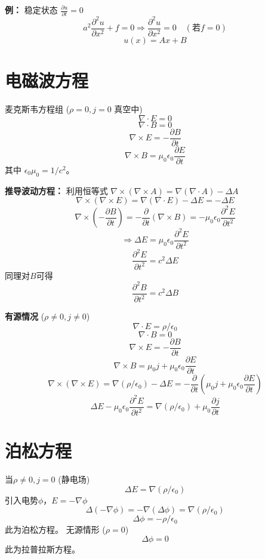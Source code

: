 \documentclass{article}
\begin{document}
	\textbf{例：} 稳定状态 $\frac{\partial u}{\partial t}=0$
	$$ 
	a^2 \frac{\partial^2 u}{\partial x^2} + f = 0 \Rightarrow \frac{\partial^2 u}{\partial x^2} = 0 \quad (\text{若} f=0) 
	$$
	$$ u(x) = Ax + B $$
	
	\section*{电磁波方程}
	麦克斯韦方程组 ($\rho=0, j=0$ 真空中)
	$$ \nabla \cdot E = 0 $$
	$$ \nabla \cdot B = 0 $$
	$$ \nabla \times E = -\frac{\partial B}{\partial t} $$
	$$ \nabla \times B = \mu_0 \epsilon_0 \frac{\partial E}{\partial t} $$
	其中 $\epsilon_0 \mu_0 = 1/c^2$。
	
	\textbf{推导波动方程：}
	利用恒等式 $\nabla \times (\nabla \times A) = \nabla(\nabla \cdot A) - \Delta A$
	$$ \nabla \times (\nabla \times E) = \nabla(\nabla \cdot E) - \Delta E = -\Delta E $$
	$$ \nabla \times (-\frac{\partial B}{\partial t}) = -\frac{\partial}{\partial t}(\nabla \times B) = -\mu_0 \epsilon_0 \frac{\partial^2 E}{\partial t^2} $$
	$$ \Rightarrow \Delta E = \mu_0 \epsilon_0 \frac{\partial^2 E}{\partial t^2} $$
	$$ \frac{\partial^2 E}{\partial t^2} = c^2 \Delta E $$
	同理对$B$可得
	$$ \frac{\partial^2 B}{\partial t^2} = c^2 \Delta B $$
	
	\textbf{有源情况} ($\rho \neq 0, j \neq 0$)
	$$ \nabla \cdot E = \rho/\epsilon_0 $$
	$$ \nabla \cdot B = 0 $$
	$$ \nabla \times E = -\frac{\partial B}{\partial t} $$
	$$ \nabla \times B = \mu_0 j + \mu_0 \epsilon_0 \frac{\partial E}{\partial t} $$
	$$ \nabla \times (\nabla \times E) = \nabla(\rho/\epsilon_0) - \Delta E = -\frac{\partial}{\partial t}(\mu_0 j + \mu_0 \epsilon_0 \frac{\partial E}{\partial t}) $$
	$$ \Delta E - \mu_0 \epsilon_0 \frac{\partial^2 E}{\partial t^2} = \nabla(\rho/\epsilon_0) + \mu_0 \frac{\partial j}{\partial t} $$
	
	\section*{泊松方程}
	当$\rho \neq 0, j=0$ (静电场)
	$$ \Delta E = \nabla(\rho/\epsilon_0) $$
	引入电势$\phi$，$E = -\nabla\phi$
	$$ \Delta(-\nabla\phi) = -\nabla(\Delta\phi) = \nabla(\rho/\epsilon_0) $$
	$$ \Delta\phi = -\rho/\epsilon_0 $$
	此为泊松方程。
	无源情形 ($\rho=0$)
	$$ \Delta\phi = 0 $$
	此为拉普拉斯方程。
	
\end{document}
